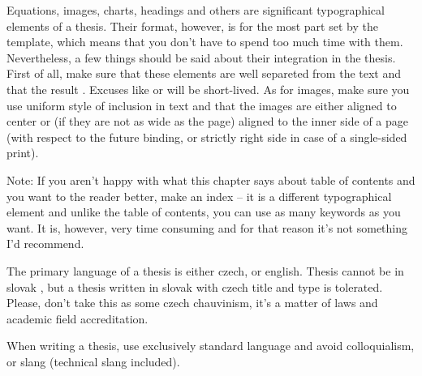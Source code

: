 {{Equations, images, charts, headings and others are significant typographical elements of a thesis. Their format, however, is for the most part  set by the template, which means that you don't have to spend too much time with them. Nevertheless, a few things should be said about their integration in the thesis. First of all, make sure that these  elements are well separeted from the text and that the result . Excuses like  or  will be short-lived. As for images, make sure you use uniform style of inclusion in text and that the images are either aligned to center or (if they are not as wide as the page) aligned to the inner side of a page (with respect to the future binding, or strictly right side in case of a single-sided print).

Note: If you aren't happy with what this chapter says about table of contents and you want to  the reader better, make an index -- it is a different typographical element and unlike the table of contents, you can use as many keywords as you want. It is, however, very time consuming and for that reason it's not something I'd recommend.
\rm

The primary language of a thesis is either czech, or english. Thesis cannot be in slovak , but a thesis written in slovak with czech title and type is tolerated. Please, don't take this as some czech chauvinism, it's a matter of laws and academic field accreditation.

When writing a thesis, use exclusively standard language and avoid colloquialism, or slang (technical slang included).

}}

